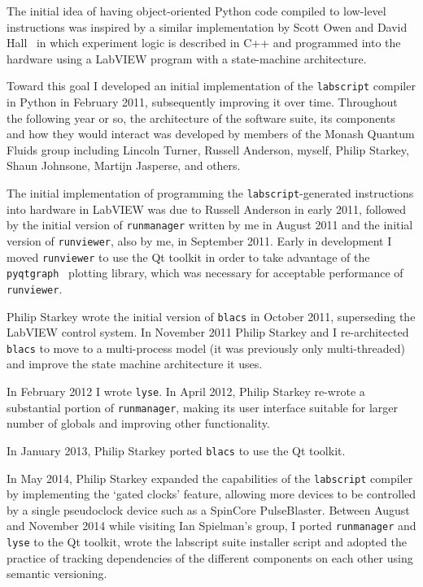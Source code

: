 The initial idea of having object-oriented Python code compiled to low-level instructions was inspired by a similar implementation by Scott Owen and David Hall~\cite{owen_fast_2003} in which experiment logic is described in C++ and programmed into the hardware using a LabVIEW program with a state-machine architecture.

Toward this goal I developed an initial implementation of the \texttt{labscript} compiler in Python in February 2011, subsequently improving it over time. Throughout the following year or so, the architecture of the software suite, its components and how they would interact was developed by members of the Monash Quantum Fluids group including Lincoln Turner, Russell Anderson, myself, Philip Starkey, Shaun Johnsone, Martijn Jasperse, and others.

The initial implementation of programming the \texttt{labscript}-generated instructions into hardware in LabVIEW was due to Russell Anderson in early 2011, followed by the initial version of \texttt{runmanager} written by me in August 2011 and the initial version of \texttt{runviewer}, also by me, in September 2011. Early in development I moved \texttt{runviewer} to use the Qt toolkit in order to take advantage of the \texttt{pyqtgraph}~\cite{campagnola_pyqtgraph_2016} plotting library, which was necessary for acceptable performance of \texttt{runviewer}.

Philip Starkey wrote the initial version of \texttt{blacs} in October 2011, superseding the LabVIEW control system. In November 2011 Philip Starkey and I re-architected \texttt{blacs} to move to a multi-process model (it was previously only multi-threaded) and improve the state machine architecture it uses.

In February 2012 I wrote \texttt{lyse}. In April 2012, Philip Starkey re-wrote a substantial portion of \texttt{runmanager}, making its user interface suitable for larger number of globals and improving other functionality.

In January 2013, Philip Starkey ported \texttt{blacs} to use the Qt toolkit.

In May 2014, Philip Starkey expanded the capabilities of the \texttt{labscript} compiler by implementing the `gated clocks' feature, allowing more devices to be controlled by a single pseudoclock device such as a SpinCore PulseBlaster. Between August and November 2014 while visiting Ian Spielman's group, I ported \texttt{runmanager} and \texttt{lyse} to the Qt toolkit, wrote the labscript suite installer script and adopted the practice of tracking dependencies of the different components on each other using semantic versioning.

